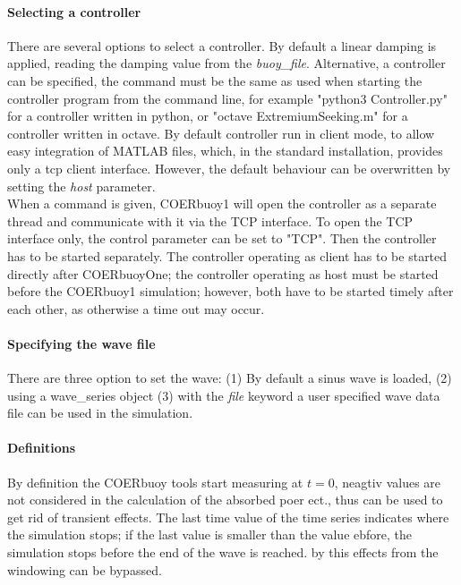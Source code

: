 \documentclass[oneside,10pt,a4paper]{book}
\begin{document}
\paragraph{Selecting a controller}
There are several options to select a controller. By default a linear damping is applied, reading the damping value from the \textit{buoy\_file}. Alternative, a controller can be specified, the command must be the same as used when starting the controller program from the command line, for example "python3 Controller.py" for a controller written in python, or "octave ExtremiumSeeking.m" for a controller written in octave. By default controller run in client mode, to allow easy integration of MATLAB files, which, in the standard installation, provides only a tcp client interface. However, the default behaviour can be overwritten by setting the \textit{host} parameter.\\
When a command is given, COERbuoy1 will open the controller as a separate thread and communicate with it via the TCP interface. To open the TCP interface only, the control parameter can be set to "TCP". Then the controller has to be started separately. The controller operating as client has to be started directly after COERbuoyOne; the controller operating as host must be started before the COERbuoy1 simulation; however, both have to be started timely after each other, as otherwise a time out may occur.
\paragraph{Specifying the wave file}
There are three option to set the wave: (1) By default a sinus wave is loaded, (2) using a wave\_series object (3) with the \textit{file} keyword a user specified wave data file can be used in the simulation.
\paragraph{Definitions}
By definition the COERbuoy tools start measuring at $t=0$, neagtiv values are not considered in the calculation of the absorbed poer ect., thus can be used to get rid of transient effects. The last time value of the time series indicates where the simulation stops; if the last value is smaller than the value ebfore, the simulation stops before the end of the wave is reached. by this effects from the windowing can be bypassed.
\end{document}
